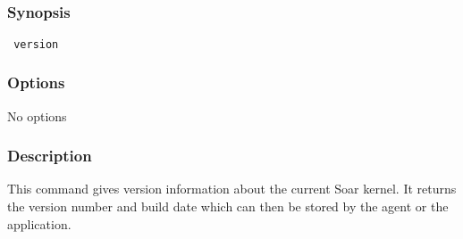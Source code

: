 \subsection{}
\label{version}
\subsubsection*{Synopsis}
\begin{verbatim}
 version
\end{verbatim}
\subsubsection*{Options}
 No options 
\subsubsection*{Description}
 This command gives version information about the current Soar kernel. It returns the version number and build date which can then be stored by the agent or the application. 
